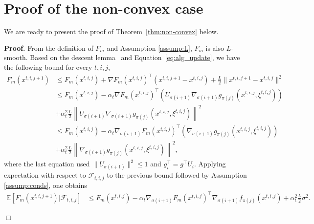 \documentclass[11pt,a4paper]{article}
\numberwithin{equation}{section}%
\newenvironment{proof}[1][Proof]{\noindent \textbf{#1.} }{\hfill$\Box$\par\medskip}
\renewcommand{\(}{\left (}
\renewcommand{\)}{\right )}
\newcommand{\Lphif}{L}
\newcommand{\Fm}{F_m}
\begin{document}
\section{Proof of the non-convex case}\label{sec:non-convex}




We are ready to present the proof of Theorem~\ref{thm:non-convex} below. 
\vspace{\baselineskip}

\begin{proof}
From the definition of $\Fm$ and Assumption \ref{assump:L}, $\Fm$ is also $\Lphif$-smooth. Based on the descent lemma~\cite[Proposition A.24]{bertsekas1997nonlinear} and Equation~\eqref{eq:alg_update}, we have the following bound for every $t,i,j$, 
\begin{align*}
\Fm(x^{t,i,j+1}) &\leq \Fm(x^{t,i,j}) + \nabla \Fm(x^{t,i,j})^\top (x^{t,i,j+1} - x^{t,i,j}) + \frac{\Lphif}{2} \|x^{t,i,j+1} - x^{t,i,j}\|^2\\
&\leq \Fm(x^{t,i,j}) - \alpha_t \nabla \Fm(x^{t,i,j})^\top \left(  U_{\sigma(i+1)} \nabla_{\sigma(i+1)} g_{\pi(j)} (x^{t,i,j}, \xi^{t,i,j}) \right)  \\
&+ \alpha_t^2 \frac{\Lphif}{2} \left\|   U_{\sigma(i+1)} \nabla_{\sigma(i+1)} g_{\pi(j)} (x^{t,i,j}, \xi^{t,i,j})\right\|^2\\
&\leq \Fm(x^{t,i,j}) - \alpha_t  \nabla_{\sigma(i+1)} \Fm(x^{t,i,j})^\top \left(  \nabla_{\sigma(i+1)} g_{\pi(j)} (x^{t,i,j}, \xi^{t,i,j}) \right)  \\
&+ \alpha_t^2 \frac{\Lphif}{2} \left\| \nabla_{\sigma(i+1)} g_{\pi(j)} (x^{t,i,j}, \xi^{t,i,j})\right\|^2,
\end{align*}
where the last equation used  $\|U_{\sigma(i+1)}\|^2 \leq 1$ and $g_i^\top = g^\top U_i$. 
Applying expectation with respect to $\mathcal{F}_{t,i,j}$ to the previous bound followed by Assumption \ref{assump:conds}, one obtains
\begin{align*}
\mathbb{E} [\Fm(x^{t,i,j+1}) | \mathcal{F}_{t,i,j}]
&\leq \Fm(x^{t,i,j}) - \alpha_t  \nabla_{\sigma(i+1)} \Fm(x^{t,i,j})^\top  \nabla_{\sigma(i+1)} f_{\pi(j)} (x^{t,i,j})  + \alpha_t^2 \frac{\Lphif}{2} \sigma^2.
\end{align*}


\end{proof}
\end{document}
